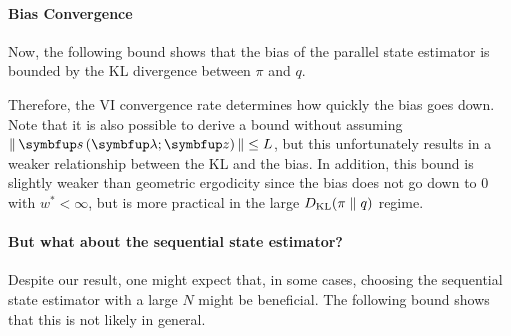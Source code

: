 \paragraph{Bias Convergence}
Now, the following bound shows that the bias of the parallel state estimator is bounded by the KL divergence between \(\pi\) and \(q\).
%

%
Therefore, the VI convergence rate determines how quickly the bias goes down.
Note that it is also possible to derive a bound without assuming \(\norm{\vs\left(\vlambda; \vz\right)} \leq L\), but this unfortunately results in a weaker relationship between the KL and the bias.
In addition, this bound is slightly weaker than geometric ergodicity since the bias does not go down to 0 with \(w^* < \infty\), but is more practical in the large \(D_{\mathrm{KL}}(\pi\parallel q)\) regime.




\vspace{-0.05in}
\paragraph{But what about the sequential state estimator?}
Despite our result, one might expect that, in some cases, choosing the sequential state estimator with a large \(N\) might be beneficial.
The following bound shows that this is not likely in general.

